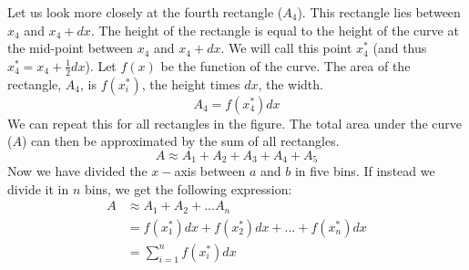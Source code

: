 \documentclass[a4paper]{report}
\begin{document}
Let us look more closely at the fourth rectangle ($A_4$). This rectangle lies between $x_4$ and $x_4+dx$. The height of the rectangle is equal to the height of the curve at the mid-point between $x_4$ and $x_4+dx$. We will call this point  $x_4^*$ (and thus $x_4^* = x_4 + \frac{1}{2} dx$).  Let $f(x)$ be the function of the curve. The area of the rectangle, $A_4$, is $f(x_i^*)$, the height times $dx$, the width. 
\begin{equation}
A_{4}=f(x_{4}^*)dx
\end{equation}
We can repeat this for all rectangles in the figure. The total area under the curve ($A$) can then be approximated by the sum of all rectangles. 
\begin{equation}
A \approx A_1 + A_2 + A_3 + A_4 +A_5
\end{equation}
Now we have divided the $x-$axis between $a$ and $b$ in five bins. If instead we divide it in $n$ bins, we get the following expression:
\begin{equation}
\begin{aligned}
A&\approx A_{1}+A_{2}+ ...A_{n}\\
&= f(x_{1}^*)dx+f(x_{2}^*)dx+...+f(x_{n}^*)dx\\
&= \sum\limits_{i=1}^nf(x_{i}^*)dx
\end{aligned}
\end{equation}
\end{document}
